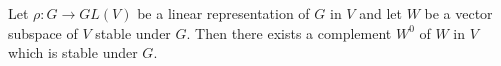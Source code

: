 Let $\rho: G \rightarrow GL(V)$ be a linear representation of $G$ in $V$ and let $W$ be a vector subspace of $V$ stable under $G$. Then there exists a complement $W^0$ of $W$ in $V$ which is stable under $G$.

